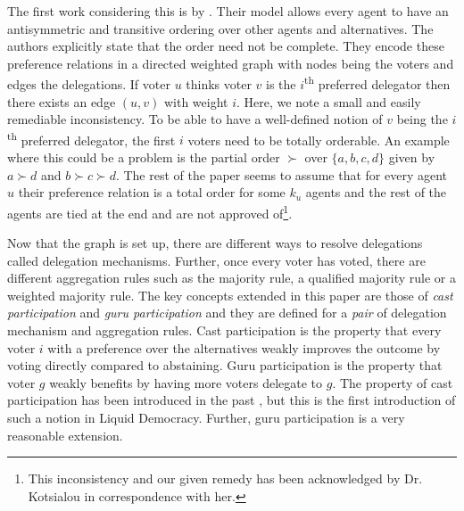 \documentclass[11pt,a4paper, titlepage]{article}
\theoremstyle{definition}
\begin{document}
The first work considering this is by \citet{kotsialou}.
Their model allows every agent to have an antisymmetric and transitive ordering over other agents and alternatives.
The authors explicitly state that the order need not be complete.
They encode these preference relations in a directed weighted graph with nodes being the voters and edges the delegations.
If voter $u$ thinks voter $v$ is the $i$\textsuperscript{th} preferred delegator then there exists an edge $(u, v)$ with weight $i$.
Here, we note a small and easily remediable inconsistency. 
To be able to have a well-defined notion of $v$ being the $i$\textsuperscript{th} preferred delegator, the first $i$ voters need to be totally orderable.
An example where this could be a problem is the partial order $\succ$ over $\{a, b, c, d\}$ given by $a \succ d$ and $b \succ c \succ d$.
The rest of the paper seems to assume that for every agent $u$ their preference relation is a total order for some $k_u$ agents and the rest of the agents are tied at the end and are not approved of\footnote{This inconsistency and our given remedy has been acknowledged by Dr. Kotsialou in correspondence with her.}.

Now that the graph is set up, there are different ways to resolve delegations called delegation mechanisms. Further, once every voter has voted, there are different aggregation rules such as the majority rule, a qualified majority rule or a weighted majority rule.
The key concepts extended in this paper are those of \emph{cast participation} and \emph{guru participation} and they are defined for a \emph{pair} of delegation mechanism and aggregation rules.
Cast participation is the property that every voter $i$ with a preference over the alternatives weakly improves the outcome by voting directly compared to abstaining.
Guru participation is the property that voter $g$ weakly benefits by having more voters delegate to $g$.
The property of cast participation has been introduced in the past \citep{moulin1988condorcet}, but this is the first introduction of such a notion in Liquid Democracy. Further, guru participation is a very reasonable extension.
\end{document}
